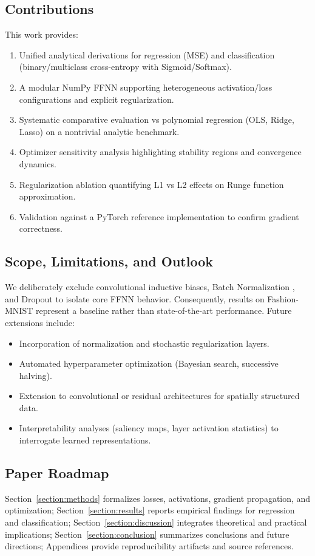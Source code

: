 \documentclass[amssymb,twocolumn,aps]{revtex4}
\begin{document}
\subsection*{Contributions}
This work provides:
\begin{enumerate}
    \item Unified analytical derivations for regression (MSE) and classification (binary/multiclass cross-entropy with Sigmoid/Softmax).
    \item A modular NumPy FFNN supporting heterogeneous activation/loss configurations and explicit regularization.
    \item Systematic comparative evaluation vs polynomial regression (OLS, Ridge, Lasso) on a nontrivial analytic benchmark.
    \item Optimizer sensitivity analysis highlighting stability regions and convergence dynamics.
    \item Regularization ablation quantifying L1 vs L2 effects on Runge function approximation.
    \item Validation against a PyTorch reference implementation to confirm gradient correctness.
\end{enumerate}

\subsection*{Scope, Limitations, and Outlook}
We deliberately exclude convolutional inductive biases, Batch Normalization \cite{ioffe2015batchnorm}, and Dropout \cite{srivastava2014dropout} to isolate core FFNN behavior. Consequently, results on Fashion-MNIST represent a baseline rather than state-of-the-art performance. Future extensions include:
\begin{itemize}
    \item Incorporation of normalization and stochastic regularization layers.
    \item Automated hyperparameter optimization (Bayesian search, successive halving).
    \item Extension to convolutional or residual architectures for spatially structured data.
    \item Interpretability analyses (saliency maps, layer activation statistics) to interrogate learned representations.
\end{itemize}

\subsection*{Paper Roadmap}
Section~\ref{section:methods} formalizes losses, activations, gradient propagation, and optimization; Section~\ref{section:results} reports empirical findings for regression and classification; Section~\ref{section:discussion} integrates theoretical and practical implications; Section~\ref{section:conclusion} summarizes conclusions and future directions; Appendices provide reproducibility artifacts and source references.
\end{document}
